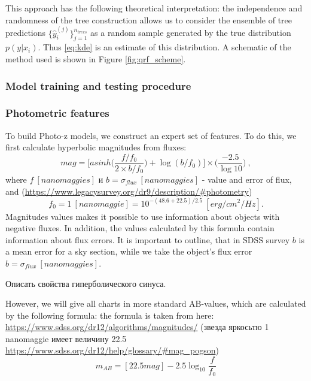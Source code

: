 \documentclass[fleqn,usenatbib]{mnras}
\begin{document}
This approach has the following theoretical interpretation: the independence and randomness of the tree construction allows us to consider the ensemble of tree predictions $\{\hat{y}^{(j)}_i\}_{j=1}^{n_{trees}}$ as a random sample generated by the true distribution $p(y|x_i)$. Thus \eqref{eq:kde} is an estimate of this distribution. A schematic of the method used is shown in Figure \ref{fig:qrf_scheme}.

\subsubsection{Model training and testing procedure}


\subsubsection{Photometric features}
To build Photo-z models, we construct an expert set of features. To do this, we first calculate hyperbolic magnitudes from fluxes:
\begin{equation}\label{eq:asinhmag}
    mag = \Bigg[asinh\Bigg(\frac{f/f_0}{2 \times b/f_0}\Bigg) + \log(b/f_0)\Bigg] \times \Bigg(\frac{-2.5}{\log 10}\Bigg) ~,
\end{equation}
where $f~[nanomaggies]$ и $b = \sigma_{flux}~[nanomaggies]$ - value and error of flux, and (\url{https://www.legacysurvey.org/dr9/description/#photometry})
\begin{equation}
    f_0 = 1~[nanomaggie] = 10^{-(48.6+22.5)/2.5}~[erg/cm^2/Hz].
\end{equation}
Magnitudes values makes it possible to use information about objects with negative fluxes. In addition, the values calculated by this formula contain information about flux errors. It is important to outline, that in SDSS survey $b$ is a mean error for a sky section, while we take the object's flux error $b = \sigma_{flux}~[nanomaggies]$.

Описать свойства гиперболического синуса.

However, we will give all charts in more standard AB-values, which are calculated by the following formula: the formula is taken from here: \url{https://www.sdss.org/dr12/algorithms/magnitudes/} (звезда яркосьтю 1 nanomaggie имеет величину 22.5 \url{https://www.sdss.org/dr12/help/glossary/#mag_pogson})
\begin{equation}\label{eq:mag_ab}
    m_{AB} = [22.5 mag] - 2.5 \log_{10} \frac{f}{f_0}
\end{equation}
\end{document}
